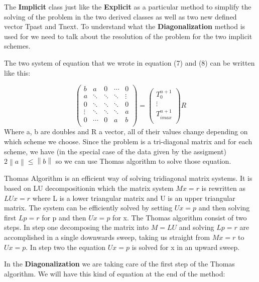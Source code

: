 \documentclass [10 pt, a4 paper]{article}
\begin{document}
The \textbf{Implicit} class just like the \textbf{Explicit} as a particular method to 
simplify the solving of the problem in the two derived classes as well as two new defined vector Tpast and Tnext.
To understand what the \textbf{Diagonalization} method is used for we need to talk about
the resolution of the problem for the two implicit schemes.

\vspace{0.3cm}

The two system of equation that we wrote in equation (7) and (8) can be written like this:

\begin{equation}
\begin{pmatrix} b    &    a   &    0   & \cdots &   0    \\
a    & \ddots & \ddots & \ddots & \vdots \\
0    & \ddots & \ddots & \ddots &    0   \\
\vdots & \ddots & \ddots & \ddots &   a    \\ 
0    & \cdots &    0   &   a    &    b   \\
\end{pmatrix}
=
\begin{pmatrix} T_{0}^{n+1} \\ 
\vdots \\ 
T_{imax}^{n+1} \\
\end{pmatrix}
R
\end{equation}
Where a, b are doubles and R a vector, all of their values change depending on 
which scheme we choose. Since the problem is a tri-diagonal matrix and for each scheme,
we have (in the special case of the data given by the assigment) 
$ 2\left \| a \right \| \leq \left \| b \right \| $ so we can use Thomas algorithm to
solve those equation.

Thomas Algorithm is an efficient way of solving tridiagonal matrix systems. It is based
on LU decompositionin which the matrix system $Mx = r$ is rewritten as $LUx = r$ where L 
is a lower triangular matrix and U is an upper triangular matrix. The system can be 
efficiently solved by setting $Ux = p$ and then solving first $Lp = r$ for p and then 
$Ux=p$ for x. The Thomas algorithm consist of two steps. In step one decomposing the matrix
into $M=LU$ and solving $Lp=r$ are accomplished in a single downwards sweep, taking us
straight from $Mx=r$ to $Ux=p$. In step two the equation $Ux=p$ is solved for x in  an
upward sweep.

In the \textbf{Diagonalization} we are taking care of the first step of the Thomas algorithm.
We will have this kind of equation at the end of the method:
\end{document}
